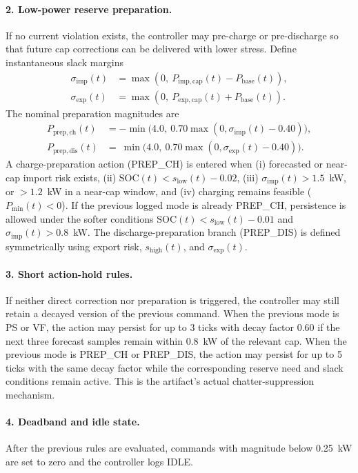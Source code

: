 \documentclass[preprint,12pt]{elsarticle}
\def\texttt#1{#1}%
\newcommand{\SOC}{\mathrm{SOC}}
\newcommand{\Pbase}{P_{\mathrm{base}}}
\begin{document}
\paragraph{2. Low-power reserve preparation.}
If no current violation exists, the controller may pre-charge or pre-discharge so that future cap corrections can be delivered with lower stress. Define instantaneous slack margins
\begin{align}
\sigma_{\mathrm{imp}}(t) &= \max(0,\ P_{\mathrm{imp,cap}}(t)-\Pbase(t)),\\
\sigma_{\mathrm{exp}}(t) &= \max(0,\ P_{\mathrm{exp,cap}}(t)+\Pbase(t)).
\end{align}
The nominal preparation magnitudes are
\begin{align}
P_{\mathrm{prep,ch}}(t) &= -\min\!\big(4.0,\ 0.70\max(0,\sigma_{\mathrm{imp}}(t)-0.40)\big),\\
P_{\mathrm{prep,dis}}(t) &= \ \min\!\big(4.0,\ 0.70\max(0,\sigma_{\mathrm{exp}}(t)-0.40)\big).
\end{align}
A charge-preparation action (\texttt{PREP\_CH}) is entered when (i) forecasted or near-cap import risk exists, (ii) $\SOC(t)<s_{\mathrm{low}}(t)-0.02$, (iii) $\sigma_{\mathrm{imp}}(t)>1.5$~kW, or $>1.2$~kW in a near-cap window, and (iv) charging remains feasible ($P_{\min}(t)<0$). If the previous logged mode is already \texttt{PREP\_CH}, persistence is allowed under the softer conditions $\SOC(t)<s_{\mathrm{low}}(t)-0.01$ and $\sigma_{\mathrm{imp}}(t)>0.8$~kW. The discharge-preparation branch (\texttt{PREP\_DIS}) is defined symmetrically using export risk, $s_{\mathrm{high}}(t)$, and $\sigma_{\mathrm{exp}}(t)$.

\paragraph{3. Short action-hold rules.}
If neither direct correction nor preparation is triggered, the controller may still retain a decayed version of the previous command. When the previous mode is \texttt{PS} or \texttt{VF}, the action may persist for up to 3 ticks with decay factor $0.60$ if the next three forecast samples remain within 0.8~kW of the relevant cap. When the previous mode is \texttt{PREP\_CH} or \texttt{PREP\_DIS}, the action may persist for up to 5 ticks with the same decay factor while the corresponding reserve need and slack conditions remain active. This is the artifact's actual chatter-suppression mechanism.

\paragraph{4. Deadband and idle state.}
After the previous rules are evaluated, commands with magnitude below 0.25~kW are set to zero and the controller logs \texttt{IDLE}.
\end{document}

